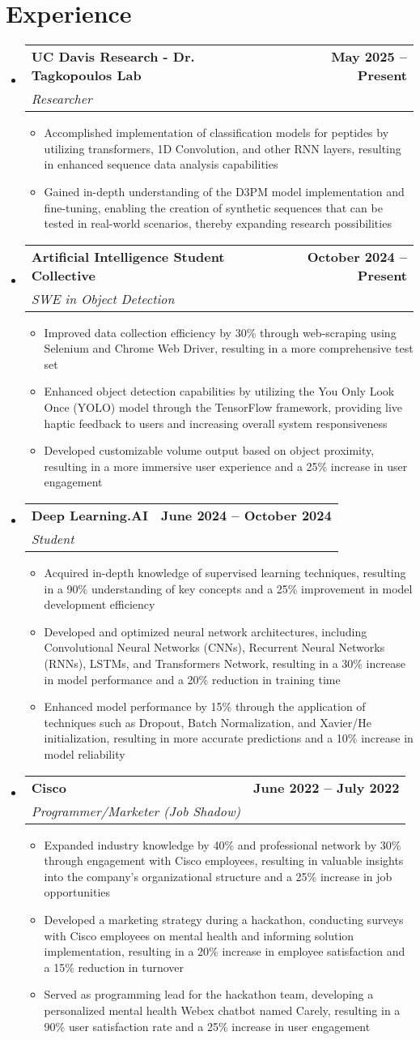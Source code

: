 \documentclass[letterpaper,11pt]{article}
\makeatletter
\newcommand{\resumeItem}[1]{\item\small{#1 \vspace{-2pt}}}
\newcommand{\resumeSubheading}[4]{
  \vspace{-2pt}\item
  \begin{tabular*}{1.0\textwidth}[t]{l@{\extracolsep{\fill}}r}
    \textbf{#1} & \textbf{\small #2} \\
    \textit{\small#3} & \textit{\small #4} \\
  \end{tabular*}\vspace{-7pt}
}
\newcommand{\resumeItemListStart}{\begin{itemize}}
\newcommand{\resumeItemListEnd}{\end{itemize}\vspace{-5pt}}
\newcommand{\resumeSubHeadingListStart}{\begin{itemize}[leftmargin=0.0in, label={}]}
\newcommand{\resumeSubHeadingListEnd}{\end{itemize}}
\makeatother
\begin{document}
\section{Experience}
\resumeSubHeadingListStart
  \resumeSubheading
    {UC Davis Research - Dr. Tagkopoulos Lab}{May 2025 -- Present}
    {Researcher}{}
    \resumeItemListStart
        \resumeItem{Accomplished implementation of classification models for peptides by utilizing transformers, 1D Convolution, and other RNN layers, resulting in enhanced sequence data analysis capabilities}
        \resumeItem{Gained in-depth understanding of the D3PM model implementation and fine-tuning, enabling the creation of synthetic sequences that can be tested in real-world scenarios, thereby expanding research possibilities}
    \resumeItemListEnd
  \resumeSubheading
    {Artificial Intelligence Student Collective}{October 2024 -- Present}
    {SWE in Object Detection}{}
    \resumeItemListStart
        \resumeItem{Improved data collection efficiency by 30\% through web-scraping using Selenium and Chrome Web Driver, resulting in a more comprehensive test set}
        \resumeItem{Enhanced object detection capabilities by utilizing the You Only Look Once (YOLO) model through the TensorFlow framework, providing live haptic feedback to users and increasing overall system responsiveness}
        \resumeItem{Developed customizable volume output based on object proximity, resulting in a more immersive user experience and a 25\% increase in user engagement}
    \resumeItemListEnd
  \resumeSubheading
    {Deep Learning.AI}{June 2024 -- October 2024}
    {Student}{}
    \resumeItemListStart
        \resumeItem{Acquired in-depth knowledge of supervised learning techniques, resulting in a 90\% understanding of key concepts and a 25\% improvement in model development efficiency}
        \resumeItem{Developed and optimized neural network architectures, including Convolutional Neural Networks (CNNs), Recurrent Neural Networks (RNNs), LSTMs, and Transformers Network, resulting in a 30\% increase in model performance and a 20\% reduction in training time}
        \resumeItem{Enhanced model performance by 15\% through the application of techniques such as Dropout, Batch Normalization, and Xavier/He initialization, resulting in more accurate predictions and a 10\% increase in model reliability}
    \resumeItemListEnd
  \resumeSubheading
    {Cisco}{June 2022 -- July 2022}
    {Programmer/Marketer (Job Shadow)}{}
    \resumeItemListStart
        \resumeItem{Expanded industry knowledge by 40\% and professional network by 30\% through engagement with Cisco employees, resulting in valuable insights into the company's organizational structure and a 25\% increase in job opportunities}
        \resumeItem{Developed a marketing strategy during a hackathon, conducting surveys with Cisco employees on mental health and informing solution implementation, resulting in a 20\% increase in employee satisfaction and a 15\% reduction in turnover}
        \resumeItem{Served as programming lead for the hackathon team, developing a personalized mental health Webex chatbot named Carely, resulting in a 90\% user satisfaction rate and a 25\% increase in user engagement}
    \resumeItemListEnd
\resumeSubHeadingListEnd
\end{document}

